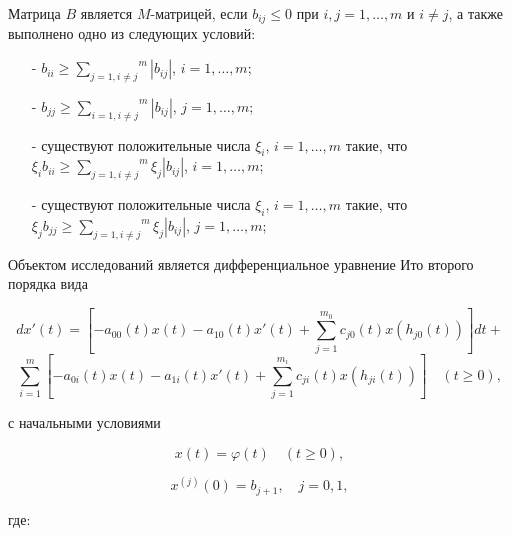 \begin{lemma}
\cite{kri-bib-18} Матрица $B$ является $M$-матрицей, если $b_{ij}\le 0$ при $i,j=1,\dots,m$ и $i\neq j$, а также выполнено одно из следующих условий:

\begin{itemize}
	\item[-]
	$b_{ii}\ge \overset m{\underset{j=1,i\neq j}{\sum }}|b_{ij}|$, $i=1,\dots,m$;
	
	\item[-]
	$b_{jj}\ge \overset m{\underset{i=1,i\neq j}{\sum }}|b_{ij}|$, $j=1,\dots,m$;
	
	\item[-]
	существуют положительные числа $\xi_i$, $i=1,\dots,m$ такие, что \\ $\xi_ib_{ii}\ge \overset m{\underset{j=1,i\neq j}{\sum}}\xi_j|b_{ij}|$, $i=1,\dots,m$;
	
	\item[-]
	существуют положительные числа $\xi_i$, $i=1,\dots,m$ такие, что \\ $\xi_jb_{jj}\ge \overset m{\underset{j=1,i\neq j}{\sum}}\xi_j|b_{ij}|$, $j=1,\dots,m$;
\end{itemize}
\end{lemma}

Объектом исследований является дифференциальное уравнение Ито второго порядка вида

\begin{equation}\label{kri-eq-1}
	dx'(t) = \left[-a_{00}(t)x(t) - a_{10}(t)x'(t) + \sum_{j=1}^{m_0}c_{j0}(t)x(h_{j0}(t))\right]dt +
\end{equation}
\begin{equation*}
	\sum_{i=1}^{m} \left[-a_{0i}(t)x(t)-a_{1i}(t)x'(t)+\sum_{j=1}^{m_i}c_{ji}(t)x(h_{ji}(t))\right] \quad (t \ge 0),
\end{equation*}

с начальными условиями

\begin{equation}\label{kri-eq-1a}
	x(t)=\varphi (t)\quad(t\ge 0),
\end{equation}

\begin{equation}\label{kri-eq-1b}
	x^{(j)}(0)=b_{j+1}, \quad j=0,1,
\end{equation}

где:

